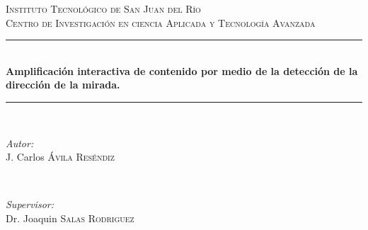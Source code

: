 \documentclass[12pt]{book} %
\begin{document}



\begin{titlepage}

\newcommand{\HRule}{\rule{\linewidth}{0.5mm}} %

\center %
 

\textsc{\LARGE Instituto Tecnológico de San Juan del Río}\\[1.5cm] %
\textsc{\Large Centro de Investigación en ciencia Aplicada y Tecnología Avanzada}\\[0.5cm] %


\HRule \\[0.4cm]
{ \huge \bfseries Amplificación interactiva de contenido por medio de la detección de la dirección de la mirada.}\\[0.4cm] %
\HRule \\[1.5cm]
 

\begin{minipage}{0.4\textwidth}
\begin{flushleft} \large
\emph{Autor:}\\
J. Carlos \textsc{\'Avila Reséndiz} %
\end{flushleft}
\end{minipage}
~
\begin{minipage}{0.4\textwidth}
\begin{flushright} \large
\emph{Supervisor:} \\
Dr. Joaquin  \textsc{Salas Rodriguez} %
\end{flushright}
\end{minipage}\\[4cm]


\end{titlepage}
\end{document}
